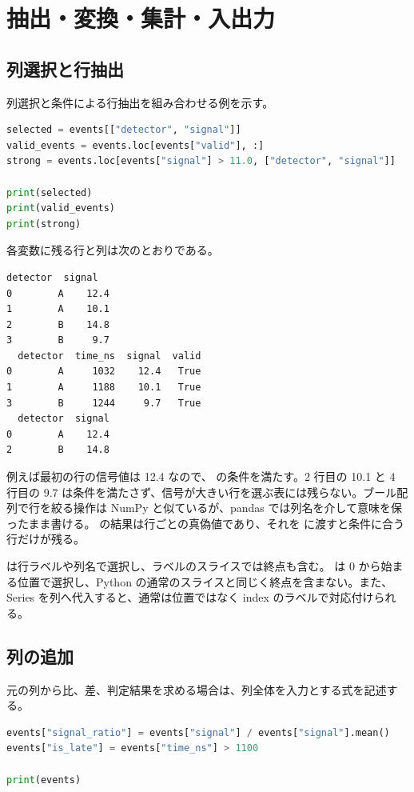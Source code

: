 \section{抽出・変換・集計・入出力}

\subsection{列選択と行抽出}

列選択と条件による行抽出を組み合わせる例を示す。

\begin{lstlisting}[language=Python]
selected = events[["detector", "signal"]]
valid_events = events.loc[events["valid"], :]
strong = events.loc[events["signal"] > 11.0, ["detector", "signal"]]

print(selected)
print(valid_events)
print(strong)
\end{lstlisting}

各変数に残る行と列は次のとおりである。

\begin{lstlisting}[numbers=none, xleftmargin=2\zw]
  detector  signal
0        A    12.4
1        A    10.1
2        B    14.8
3        B     9.7
  detector  time_ns  signal  valid
0        A     1032    12.4   True
1        A     1188    10.1   True
3        B     1244     9.7   True
  detector  signal
0        A    12.4
2        B    14.8
\end{lstlisting}

例えば最初の行の信号値は 12.4 なので、 の条件を満たす。2 行目の 10.1 と 4 行目の 9.7 は条件を満たさず、信号が大きい行を選ぶ表には残らない。ブール配列で行を絞る操作は NumPy と似ているが、pandas では列名を介して意味を保ったまま書ける。 の結果は行ごとの真偽値であり、それを  に渡すと条件に合う行だけが残る。

 は行ラベルや列名で選択し、ラベルのスライスでは終点も含む。 は 0 から始まる位置で選択し、Python の通常のスライスと同じく終点を含まない。また、Series を列へ代入すると、通常は位置ではなく index のラベルで対応付けられる。

\subsection{列の追加}

元の列から比、差、判定結果を求める場合は、列全体を入力とする式を記述する。

\begin{lstlisting}[language=Python]
events["signal_ratio"] = events["signal"] / events["signal"].mean()
events["is_late"] = events["time_ns"] > 1100

print(events)
\end{lstlisting}

